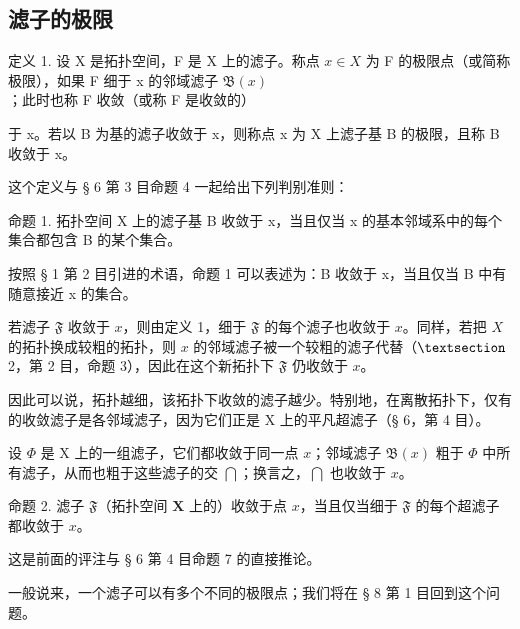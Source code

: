 \subsection{滤子的极限}

定义 1. 设 X 是拓扑空间，F 是 X 上的滤子。称点 \(x \in X\) 为 F 的极限点（或简称极限），如果 F 细于 x 的邻域滤子 \(\mathfrak{B}(x)\)；此时也称 F 收敛（或称 F 是收敛的）

于 x。若以 B 为基的滤子收敛于 x，则称点 x 为 X 上滤子基 B 的极限，且称 B 收敛于 x。

这个定义与 § 6 第 3 目命题 4 一起给出下列判别准则：

命题 1. 拓扑空间 X 上的滤子基 B 收敛于 x，当且仅当 x 的基本邻域系中的每个集合都包含 B 的某个集合。

按照 § 1 第 2 目引进的术语，命题 1 可以表述为：B 收敛于 x，当且仅当 B 中有随意接近 x 的集合。

若滤子 \(\mathfrak{F}\) 收敛于 \(x\)，则由定义 1，细于 \(\mathfrak{F}\) 的每个滤子也收敛于 \(x\)。同样，若把 \(X\) 的拓扑换成较粗的拓扑，则 \(x\) 的邻域滤子被一个较粗的滤子代替（\(\S\) 2，第 2 目，命题 3），因此在这个新拓扑下 \(\mathfrak{F}\) 仍收敛于 \(x\)。

因此可以说，拓扑越细，该拓扑下收敛的滤子越少。特别地，在离散拓扑下，仅有的收敛滤子是各邻域滤子，因为它们正是 X 上的平凡超滤子（§ 6，第 4 目）。

设 \(\Phi\) 是 X 上的一组滤子，它们都收敛于同一点 \(x\)；邻域滤子 \(\mathfrak{B}(x)\) 粗于 \(\Phi\) 中所有滤子，从而也粗于这些滤子的交 \(\bigcap\)；换言之，\(\bigcap\) 也收敛于 \(x\)。

命题 2. 滤子 \(\mathfrak{F}\)（拓扑空间 \(\mathbf{X}\) 上的）收敛于点 \(x\)，当且仅当细于 \(\mathfrak{F}\) 的每个超滤子都收敛于 \(x\)。

这是前面的评注与 § 6 第 4 目命题 7 的直接推论。

一般说来，一个滤子可以有多个不同的极限点；我们将在 § 8 第 1 目回到这个问题。

